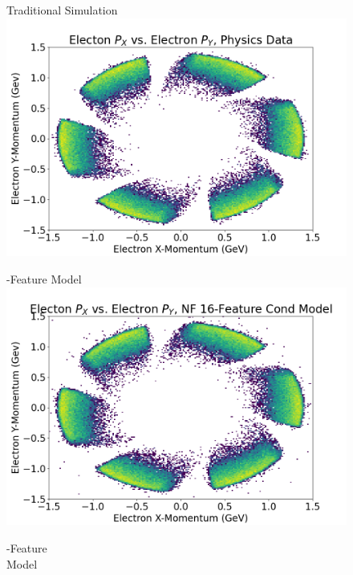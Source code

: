 \begin{figure}[!ht]
    \centering
     \begin{minipage}{0.1323\textwidth}
        \centering
        Traditional Simulation
        \includegraphics[width=.99\textwidth,trim={0 0 0 0},clip]{Chapters/Ch3-Simulations/normalizing_flows/pics/FinalPictures/Hists2D/Electon_P_X_vs_Electron_P_Y,_Physics_Data.png}
        
    \end{minipage}
         \begin{minipage}{0.1323\textwidth}
        -Feature Model
        \includegraphics[width=.99\textwidth,trim={0 0 0 0},clip]{Chapters/Ch3-Simulations/normalizing_flows/pics/FinalPictures/Hists2D/Electon_P_X_vs_Electron_P_Y,_NF_16-Feature_Cond_Model.png}

    \end{minipage}
         \begin{minipage}{0.1323\textwidth}
        -Feature\\ Model
       

\end{minipage}
\end{figure}
